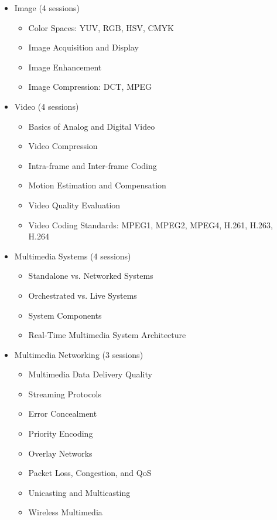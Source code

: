 \documentclass[12pt]{article}
\begin{document}
\begin{itemize}
    \item Image (4 sessions)
    \begin{itemize}
        \item Color Spaces: YUV, RGB, HSV, CMYK
        \item Image Acquisition and Display
        \item Image Enhancement
        \item Image Compression: DCT, MPEG
    \end{itemize}
    
    \item Video (4 sessions)
    \begin{itemize}
        \item Basics of Analog and Digital Video
        \item Video Compression
        \item Intra-frame and Inter-frame Coding
        \item Motion Estimation and Compensation
        \item Video Quality Evaluation
        \item Video Coding Standards: MPEG1, MPEG2, MPEG4, H.261, H.263, H.264
    \end{itemize}
    
    \item Multimedia Systems (4 sessions)
    \begin{itemize}
        \item Standalone vs. Networked Systems
        \item Orchestrated vs. Live Systems
        \item System Components
        \item Real-Time Multimedia System Architecture
    \end{itemize}
    
    \item Multimedia Networking (3 sessions)
    \begin{itemize}
        \item Multimedia Data Delivery Quality
        \item Streaming Protocols
        \item Error Concealment
        \item Priority Encoding
        \item Overlay Networks
        \item Packet Loss, Congestion, and QoS
        \item Unicasting and Multicasting
        \item Wireless Multimedia
    \end{itemize}
    

\end{itemize}
\end{document}
